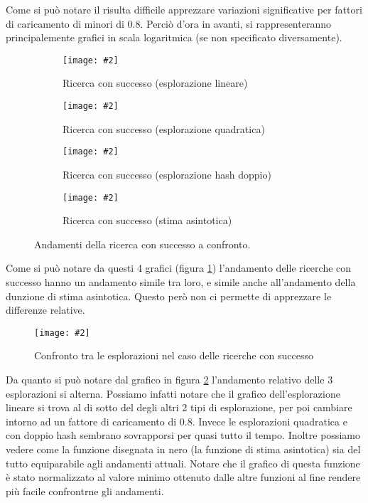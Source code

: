 \documentclass{article}
\newcommand{\image}[3][1]{
	\centering
	\texttt{[image: \#2]}
	\caption{#3}
}
\begin{document}
\label{Motivazione_scala}
Come si può notare il risulta difficile apprezzare variazioni significative per fattori di caricamento di minori di 0.8. Perciò d'ora in avanti, si rappresenteranno principalemente grafici in scala logaritmica (se non specificato diversamente). 

\begin{figure}[H]
\begin{subfigure}[b]{0.5\textwidth}
\image{Successo_Lineare_scala_logaritmica}{Ricerca con successo (esplorazione lineare)}
\end{subfigure}
\begin{subfigure}[b]{0.5\textwidth}
\image{Successo_Quadratico_scala_logaritmica}{Ricerca con successo (esplorazione quadratica)}
\end{subfigure}
\begin{subfigure}[b]{0.5\textwidth}
\image{Successo_Doppio_scala_logaritmica}{Ricerca con successo (esplorazione hash doppio)}
\end{subfigure}
\begin{subfigure}[b]{0.5\textwidth}
\image{Successo_Asintotica_scala_logaritmica}{Ricerca con successo (stima asintotica)}
\end{subfigure}
\caption{Andamenti della ricerca con successo a confronto.}
\label{fig:Successo_quartetto}
\end{figure}

Come si può notare da questi 4 grafici (figura \ref{fig:Successo_quartetto}) l'andamento delle ricerche con successo hanno un andamento simile tra loro, e simile anche all'andamento della dunzione di stima asintotica. Questo però non ci permette di apprezzare le differenze relative.

\begin{figure}[H]
\image[0.75]{Successo_Confronto_Asintotico_scala_logaritmica}{Confronto tra le esplorazioni nel caso delle ricerche con successo}
\label{fig:Successo_Confronto_Asintotico_scala_logaritmica}
\end{figure} 
Da quanto si può notare dal grafico in figura \ref{fig:Successo_Confronto_Asintotico_scala_logaritmica} l'andamento relativo delle 3 esplorazioni si alterna. Possiamo infatti notare che il grafico dell'esplorazione lineare si trova al di sotto del degli altri 2 tipi di esplorazione, per poi cambiare intorno ad un fattore di caricamento di 0.8. Invece le esplorazioni quadratica e con doppio hash sembrano sovrapporsi per quasi tutto il tempo. Inoltre possiamo vedere come la funzione disegnata in nero (la funzione di stima asintotica) sia del tutto equiparabile agli andamenti attuali. Notare che il grafico di questa funzione è stato normalizzato al valore minimo ottenuto dalle altre funzioni al fine rendere più facile confrontrne gli andamenti. 
\end{document}

